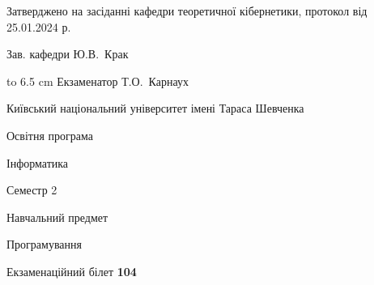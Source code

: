 \documentclass[12pt, ukrainian]{article}
\begin{document}
{\smallskip\smallskip \begin {scriptsize} Затверджено на засіданні кафедри теоретичної кібернетики, протокол   від   25.01.2024 р.\par\smallskip\smallskip\smallskip\smallskip
{\parbox {6.5 cm} {Зав. кафедри \dotfill Ю.В.~Крак}}\hspace {0.7cm} {\hbox to 6.5 cm { Екзаменатор \dotfill Т.О.~Карнаух}} \end{scriptsize}}
\newpage
{{\begin {scriptsize}\par
{ \center  Київський національний університет імені Тараса Шевченка \par}
{\parbox {5 cm}{Освітня програма \hfill}{\parbox {7 cm}{Інформатика\hfill}}\parbox {6 cm}{\hfill Семестр 2}}\par
{\parbox {5 cm} {Навчальний предмет \hfill}\parbox {7 cm}{Програмування \hfill}\parbox {6cm}{\hfill}\par}\vspace{-15pt} \end{scriptsize}}{\center Екзаменаційний білет \No \textbf { 104 }\par}}
\end{document}
